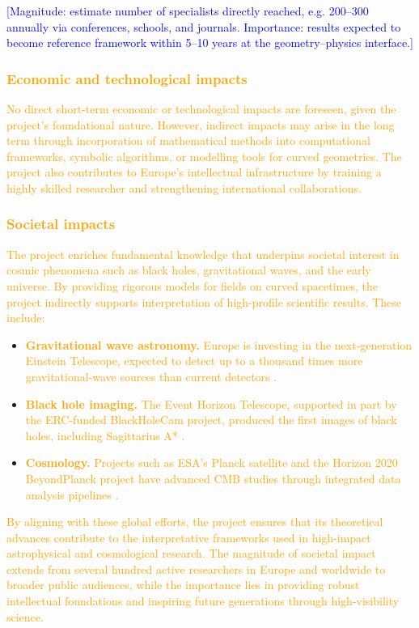 \documentclass[11pt,draftproposal]{msca-pf}
\begin{document}
\textcolor{blue}{[Magnitude: estimate number of specialists directly reached, e.g. 200–300 annually via conferences, schools, and journals. Importance: results expected to become reference framework within 5–10 years at the geometry–physics interface.]}

\subsubsection*{\textcolor{orange}{Economic and technological impacts}}
\textcolor{orange}{No direct short-term economic or technological impacts are foreseen, given the project’s foundational nature. However, indirect impacts may arise in the long term through incorporation of mathematical methods into computational frameworks, symbolic algorithms, or modelling tools for curved geometries. The project also contributes to Europe’s intellectual infrastructure by training a highly skilled researcher and strengthening international collaborations.}

\subsubsection*{\textcolor{orange}{Societal impacts}}
\textcolor{orange}{The project enriches fundamental knowledge that underpins societal interest in cosmic phenomena such as black holes, gravitational waves, and the early universe. By providing rigorous models for fields on curved spacetimes, the project indirectly supports interpretation of high-profile scientific results. These include:}
\begin{itemize}[noitemsep,topsep=2pt]
  \item \textcolor{orange}{\textbf{Gravitational wave astronomy.} Europe is investing in the next-generation Einstein Telescope, expected to detect up to a thousand times more gravitational-wave sources than current detectors .}
  \item \textcolor{orange}{\textbf{Black hole imaging.} The Event Horizon Telescope, supported in part by the ERC-funded BlackHoleCam project, produced the first images of black holes, including Sagittarius A*  .}
  \item \textcolor{orange}{\textbf{Cosmology.} Projects such as ESA’s Planck satellite and the Horizon 2020 BeyondPlanck project have advanced CMB studies through integrated data analysis pipelines .}
\end{itemize}

\textcolor{orange}{By aligning with these global efforts, the project ensures that its theoretical advances contribute to the interpretative frameworks used in high-impact astrophysical and cosmological research. The magnitude of societal impact extends from several hundred active researchers in Europe and worldwide to broader public audiences, while the importance lies in providing robust intellectual foundations and inspiring future generations through high-visibility science.}
\end{document}
